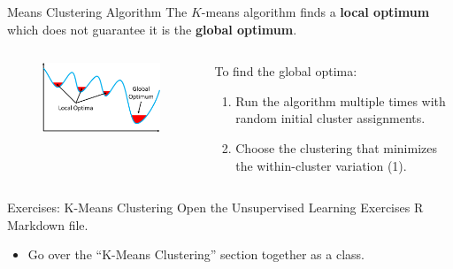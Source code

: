 \documentclass[
  ignorenonframetext,
  aspectratio=169,
]{beamer}
\providecommand{\tightlist}{%
  \setlength{\itemsep}{0pt}\setlength{\parskip}{0pt}}\usepackage{longtable,booktabs,array}
\begin{document}
\begin{frame}{Means Clustering Algorithm}
\protect\hypertarget{means-clustering-algorithm}{}
The \(K\)-means algorithm finds a \textbf{local optimum} which does not
guarantee it is the \textbf{global optimum}.

\begin{columns}[T]
\begin{column}{0.6\textwidth}
\begin{figure}

{\centering \includegraphics[width=3.125in,height=\textheight]{images/Local-Global-Optimum.png}

}

\end{figure}
\end{column}

\begin{column}{0.4\textwidth}
To find the global optima:

\begin{exampleblock}{}
\begin{enumerate}
    \item Run the algorithm multiple times with random initial cluster assignments.
    \item Choose the clustering that minimizes the within-cluster variation (1).
\end{enumerate}
\end{exampleblock}
\end{column}
\end{columns}
\end{frame}

\begin{frame}{Exercises: K-Means Clustering}
\protect\hypertarget{exercises-k-means-clustering}{}
Open the Unsupervised Learning Exercises R Markdown file.

\begin{itemize}
\tightlist
\item
  Go over the ``K-Means Clustering'' section together as a class.
\end{itemize}
\end{frame}
\end{document}
